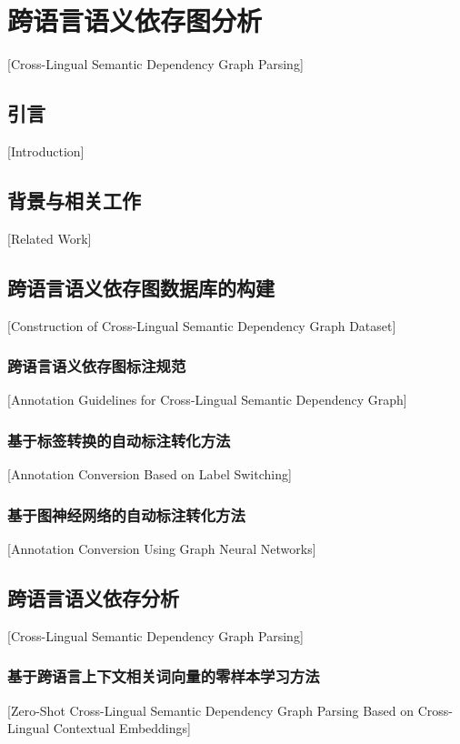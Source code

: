 
\chapter[跨语言语义依存图分析]{跨语言语义依存图分析}[Cross-Lingual Semantic Dependency Graph Parsing]

\section{引言}[Introduction]

\section{背景与相关工作}[Related Work]

\section{跨语言语义依存图数据库的构建}[Construction of Cross-Lingual Semantic Dependency Graph Dataset]

\subsection{跨语言语义依存图标注规范}[Annotation Guidelines for Cross-Lingual Semantic Dependency Graph]

\subsection{基于标签转换的自动标注转化方法}[Annotation Conversion Based on Label Switching]

\subsection{基于图神经网络的自动标注转化方法}[Annotation Conversion Using Graph Neural Networks]

\section{跨语言语义依存分析}[Cross-Lingual Semantic Dependency Graph Parsing]

\subsection{基于跨语言上下文相关词向量的零样本学习方法}[Zero-Shot Cross-Lingual Semantic Dependency Graph Parsing Based on Cross-Lingual Contextual Embeddings]

